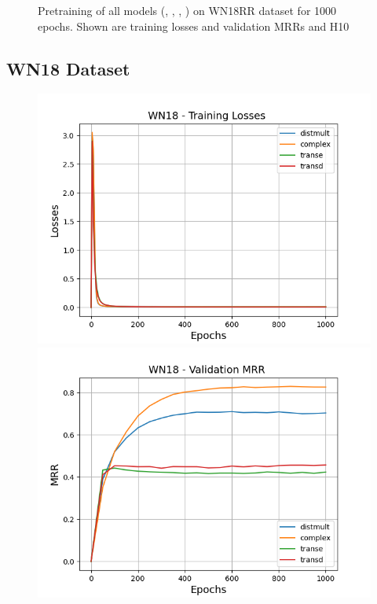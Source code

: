 \begin{figure}
\begin{minipage}{.3\textwidth}
    \end{minipage}%
    \caption{Pretraining of all models (\distmult, \complex, \transe, \transd) on \textsc{WN18RR} dataset for 1000 epochs.
    Shown are training losses and validation MRRs and H\@10}
    \label{fig:test}
\end{figure}

\subsection{WN18 Dataset}

\begin{figure}
    \centering
    \begin{minipage}{.3\textwidth}
      \centering
      \includegraphics[width=0.9\linewidth]{figures/results/pretrain/wn18/pretrain_wn18_losses.png}
    \end{minipage}%
    \begin{minipage}{.3\textwidth}
      \centering
      \includegraphics[width=0.9\linewidth]{figures/results/pretrain/wn18/pretrain_wn18_mrrs.png}

\end{minipage}
\end{figure}
